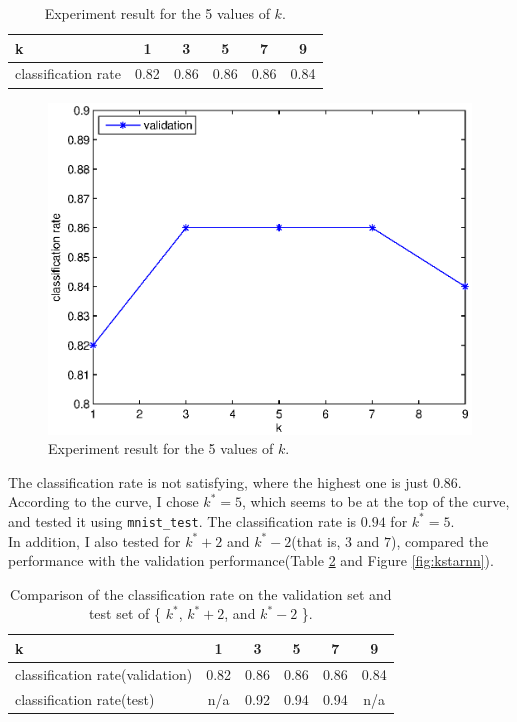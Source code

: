 \documentclass{article}
\begin{document}
\begin{table}[htbp]
\centering
\begin{tabular}{lccccc}
\toprule
k & 1 & 3 & 5 & 7 & 9\\
\midrule
classification rate & 0.82 & 0.86 & 0.86 & 0.86 & 0.84\\
\bottomrule
\end{tabular}
\caption{Experiment result for the 5 values of $k$.
\label{table:knn}}
\end{table} 

\begin{figure}[ht]
\centering
\includegraphics[width=\textwidth]{knn.eps}
\caption{Experiment result for the 5 values of $k$. 
\label{fig:knn}}
\end{figure}

The classification rate is not satisfying, where the highest one is just $0.86$. According to the curve, I chose $k^*=5$, which seems to be at the top of the curve, and tested it using \texttt{mnist\_test}. The classification rate is $0.94$ for $k^*=5$. \\

In addition, I also tested for $k^*+2$ and $k^*-2$(that is, $3$ and $7$), compared the performance with the validation performance(Table \ref{table:kstarnn} and Figure \ref{fig:kstarnn}).\\

\begin{table}[htbp]
\centering
\begin{tabular}{lccccc}
\toprule
k & 1 & 3 & 5 & 7 & 9\\
\midrule
classification rate(validation) & 0.82 & 0.86 & 0.86 & 0.86 & 0.84\\
classification rate(test) & n/a & 0.92 & 0.94 & 0.94 & n/a\\
\bottomrule
\end{tabular}
\caption{Comparison of the classification rate on the validation set and test set of \{ $k^*$, $k^*+2$, and $k^*-2$ \}.
\label{table:kstarnn}}
\end{table} 
\end{document}
